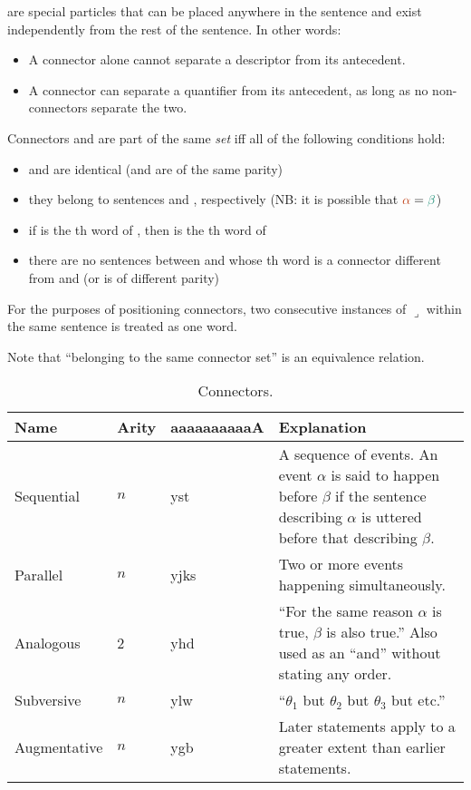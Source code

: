 \documentclass{book}
\newcommand{\lname}{aaaaaaaaaaA}
\begin{document}

 are special particles that can be placed anywhere in the sentence \emph{} and exist independently from the rest of the sentence. In other words:

\begin{itemize}
  \item A connector alone cannot separate a descriptor from its antecedent.
  \item A connector can separate a quantifier from its antecedent, as long as no non-connectors separate the two.
\end{itemize}

Connectors  and  are part of the same \emph{set}  iff all of the following conditions hold:

\begin{itemize}
  \item {} and  are identical (and are of the same parity)
  \item they belong to sentences \hlv{$\alpha$} and \hlvi{$\beta$}, respectively (NB: it is possible that $\hlv{\alpha} = \hlvi{\beta}$)
  \item if  is the th word of \hlv{$\alpha$}, then  is the th word of \hlvi{$\beta$}
  \item there are no sentences between \hlv{$\alpha$} and \hlvi{$\beta$} whose th word is a connector different from  and  (or is of different parity)
\end{itemize}

For the purposes of positioning connectors, two consecutive instances of  $\lrcorner$ within the same sentence is treated as one word.

Note that ``belonging to the same connector set'' is an equivalence relation.

\begin{table}[ht]
  \caption{Connectors.}
  \centering
  \begin{tabu} to 
    Name & Arity & \textnormal{\lname} & Explanation \\
    \hline
    Sequential & $n$ & yst & A sequence of events. An event $\alpha$ is said to happen before $\beta$ if the sentence describing $\alpha$ is uttered before that describing $\beta$. \\
    Parallel & $n$ & yjks & Two or more events happening simultaneously. \\
    Analogous & 2 & yhd & ``For the same reason $\alpha$ is true, $\beta$ is also true.'' Also used as an ``and'' without stating any order. \\
    Subversive & $n$ & ylw & ``$\theta_1$ but $\theta_2$ but $\theta_3$ but etc.'' \\
    Augmentative & $n$ & ygb & Later statements apply to a greater extent than earlier statements. \\
  \end{tabu}
\end{table}
\end{document}
